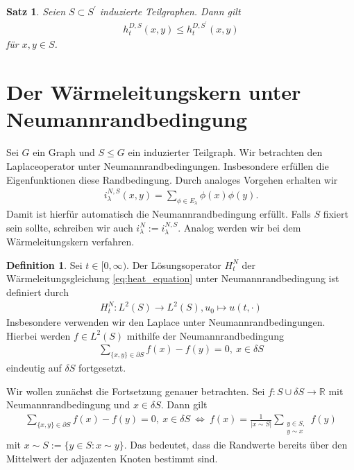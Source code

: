\documentclass[headsepline,11pt]{scrbook}
\newtheorem{thm}[lem]{Satz}
\theoremstyle{definition}
\newtheorem{df}[lem]{Definition}
\def\R{\mathbb R}
\begin{document}
\begin{thm}
	Seien $ S \subset S^\prime $ induzierte Teilgraphen.
	Dann gilt
	\begin{align}
	h_t^{D,S}(x,y) \leq h_t^{D,S^\prime}(x,y)
	\end{align}
	für $ x,y \in S $.
\end{thm}

\section{Der W\"armeleitungskern unter Neumannrandbedingung}

Sei $ G  $ ein Graph und $ S \leq G $ ein induzierter Teilgraph.
Wir betrachten den Laplaceoperator unter Neumannrandbedingungen. Insbesondere erf\"ullen die Eigenfunktionen diese Randbedingung.
Durch analoges Vorgehen erhalten wir 
\begin{align}
i_\lambda^{N,S}(x,y)
=
\sum \limits_{\phi \in E_\lambda}
\phi(x) \phi(y).
\end{align}
Damit ist hierf\"ur automatisch die Neumannrandbedingung erf\"ullt.
Falls $ S $ fixiert sein sollte, schreiben wir auch
$ i_\lambda^N := i_\lambda^{N,S} $.
Analog werden wir bei dem W\"armeleitungskern verfahren.


\begin{df}
	Sei $ t \in [0,\infty) $.
	Der L\"osungsoperator $ H_t^N $ der W\"armeleitungsgleichung \eqref{eq:heat_equation} unter Neumannrandbedingung ist definiert durch
	\begin{align}
	H_t^N : L^2(S) \to L^2(S),
	u_0 \mapsto u(t,\cdot )
	\end{align}
	Insbesondere verwenden wir den Laplace unter Neumannrandbedingungen.
	Hierbei werden $ f \in L^2(S) $ mithilfe der Neumannrandbedingung
	\begin{align}
	\sum \limits_{\{x,y\} \in \partial S} f(x) - f(y) = 0 , \ x \in \delta S
	\end{align}
	eindeutig auf $ \delta S $ fortgesetzt.
\end{df}

Wir wollen zun\"achst die Fortsetzung genauer betrachten. 
Sei $ f : S \cup \delta S \to \R $ mit Neumannrandbedingung und $ x \in \delta S $.
Dann gilt
\begin{align*}
\sum \limits_{\{x,y\} \in \partial S} f(x) - f(y) = 0 , \ x \in \delta S
\
\Leftrightarrow
\
f(x) = \frac{1}{|x \sim S|} 
\sum 
\limits_{
	\substack{
		y \in S,\\
		y \sim x
		}
	}
f(y)
\end{align*}
mit $ x \sim S := \{ y \in S : x \sim y \} $.
Das bedeutet, dass die Randwerte bereits \"uber den Mittelwert der adjazenten Knoten bestimmt sind.\\
\end{document}
